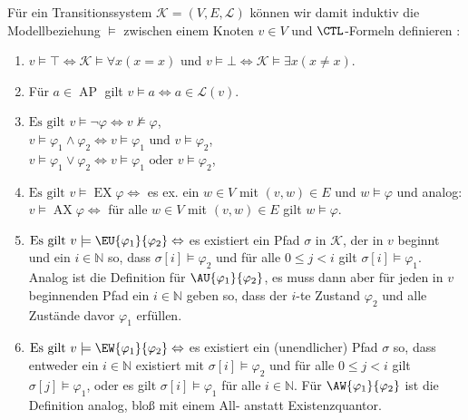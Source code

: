 \begin{definition}
	Für ein Transitionssystem $\mathcal{K}=(V,E,\mathcal{L})$ können wir damit induktiv die Modellbeziehung $\models$ zwischen einem Knoten $v\in V$ und $\CTL$-Formeln definieren \cite{baier2008principles}:
	\begin{enumerate}
		\item $v\models \top \Leftrightarrow \mathcal{K}\models\forall x(x=x)$ und $v\models \bot \Leftrightarrow \mathcal{K}\models\exists x(x\neq x)$.
		\item Für $a\in \operatorname{AP}$ gilt $v\models a \Leftrightarrow a\in \mathcal{L}(v)$.
		\item $\text{Es gilt }v\models \neg \varphi \Leftrightarrow v\not\models \varphi$,\\
		$v\models \varphi_1 \land \varphi_2 \Leftrightarrow v\models \varphi_1 \text{ und } v\models \varphi_2$,\\
		$v\models \varphi_1 \lor \varphi_2 \Leftrightarrow v\models \varphi_1 \text{ oder } v\models \varphi_2$,
		\item $\text{Es gilt }v\models \operatorname{EX}\varphi \Leftrightarrow$ es ex. ein $w\in V$ mit $(v,w)\in E$ und $w\models \varphi$ und analog:\\ 
		$v\models \operatorname{AX}\varphi \Leftrightarrow$ für alle $w\in V$ mit $(v,w)\in E$ gilt $w\models \varphi$.
		\item $\text{Es gilt }v\models \EU{\varphi_1}{\varphi_2} \Leftrightarrow$ es existiert ein Pfad $\sigma$ in $\mathcal{K}$, der in $v$ beginnt und ein $i\in \mathbb{N}$ so, dass $\sigma[i]\models \varphi_2$ und für alle $0\leq j < i$ gilt $\sigma[i]\models \varphi_1$. 
		Analog ist die Definition für $\AU{\varphi_1}{\varphi_2}$, es muss dann aber für jeden in $v$ beginnenden Pfad ein $i\in \mathbb{N}$ geben so, dass der $i$-te Zustand $\varphi_2$ und alle Zustände davor $\varphi_1$ erfüllen.
		\item $\text{Es gilt }v\models \EW{\varphi_1}{\varphi_2} \Leftrightarrow$ es existiert ein (unendlicher) Pfad $\sigma$ so, dass entweder ein $i\in \mathbb{N}$ existiert mit $\sigma[i]\models \varphi_2$ und für alle $0\leq j < i$ gilt $\sigma[j]\models \varphi_1$, oder es gilt $\sigma[i]\models \varphi_1$ für alle $i\in \mathbb{N}$.
		Für $\AW{\varphi_1}{\varphi_2}$ ist die Definition analog, bloß mit einem All- anstatt Existenzquantor.
	\end{enumerate}
\end{definition}

